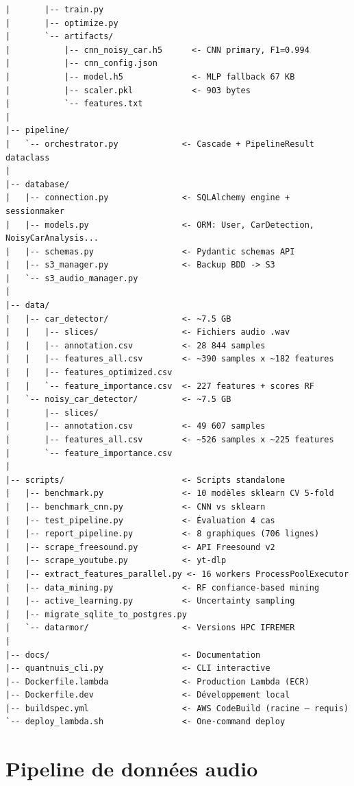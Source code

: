 \documentclass[11pt,a4paper]{article}
\begin{document}
\begin{lstlisting}[style=tree,caption={Arborescence Quantnuis-Backend (~20 GB)}]
|       |-- train.py
|       |-- optimize.py
|       `-- artifacts/
|           |-- cnn_noisy_car.h5      <- CNN primary, F1=0.994
|           |-- cnn_config.json
|           |-- model.h5              <- MLP fallback 67 KB
|           |-- scaler.pkl            <- 903 bytes
|           `-- features.txt
|
|-- pipeline/
|   `-- orchestrator.py             <- Cascade + PipelineResult dataclass
|
|-- database/
|   |-- connection.py               <- SQLAlchemy engine + sessionmaker
|   |-- models.py                   <- ORM: User, CarDetection, NoisyCarAnalysis...
|   |-- schemas.py                  <- Pydantic schemas API
|   |-- s3_manager.py               <- Backup BDD -> S3
|   `-- s3_audio_manager.py
|
|-- data/
|   |-- car_detector/               <- ~7.5 GB
|   |   |-- slices/                 <- Fichiers audio .wav
|   |   |-- annotation.csv          <- 28 844 samples
|   |   |-- features_all.csv        <- ~390 samples x ~182 features
|   |   |-- features_optimized.csv
|   |   `-- feature_importance.csv  <- 227 features + scores RF
|   `-- noisy_car_detector/         <- ~7.5 GB
|       |-- slices/
|       |-- annotation.csv          <- 49 607 samples
|       |-- features_all.csv        <- ~526 samples x ~225 features
|       `-- feature_importance.csv
|
|-- scripts/                        <- Scripts standalone
|   |-- benchmark.py                <- 10 modèles sklearn CV 5-fold
|   |-- benchmark_cnn.py            <- CNN vs sklearn
|   |-- test_pipeline.py            <- Évaluation 4 cas
|   |-- report_pipeline.py          <- 8 graphiques (706 lignes)
|   |-- scrape_freesound.py         <- API Freesound v2
|   |-- scrape_youtube.py           <- yt-dlp
|   |-- extract_features_parallel.py <- 16 workers ProcessPoolExecutor
|   |-- data_mining.py              <- RF confiance-based mining
|   |-- active_learning.py          <- Uncertainty sampling
|   |-- migrate_sqlite_to_postgres.py
|   `-- datarmor/                   <- Versions HPC IFREMER
|
|-- docs/                           <- Documentation
|-- quantnuis_cli.py                <- CLI interactive
|-- Dockerfile.lambda               <- Production Lambda (ECR)
|-- Dockerfile.dev                  <- Développement local
|-- buildspec.yml                   <- AWS CodeBuild (racine — requis)
`-- deploy_lambda.sh                <- One-command deploy
\end{lstlisting}

\section{Pipeline de données audio}
\end{document}
